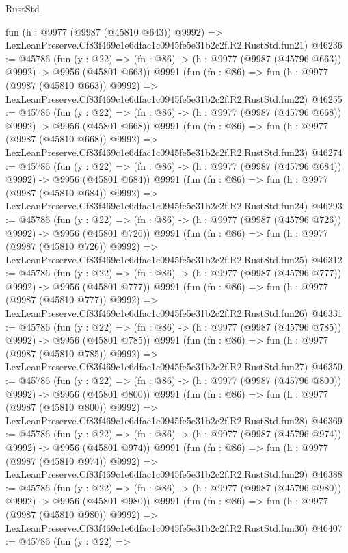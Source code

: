 \begin{lexlean}{RustStd}
\begin{coremodule}
    fun (h : @9977 (@9987 (@45810 @643)) @9992) =>
    LexLeanPreserve.Cf83f469c1e6dfac1c0945fe5e31b2c2f.R2.RustStd.fun21)
@46236 := @45786
    (fun (y : @22) => (fn : @86) -> (h : @9977 (@9987 (@45796 @663)) @9992) -> @9956 (@45801 @663))
    @9991
    (fun (fn : @86) =>
    fun (h : @9977 (@9987 (@45810 @663)) @9992) =>
    LexLeanPreserve.Cf83f469c1e6dfac1c0945fe5e31b2c2f.R2.RustStd.fun22)
@46255 := @45786
    (fun (y : @22) => (fn : @86) -> (h : @9977 (@9987 (@45796 @668)) @9992) -> @9956 (@45801 @668))
    @9991
    (fun (fn : @86) =>
    fun (h : @9977 (@9987 (@45810 @668)) @9992) =>
    LexLeanPreserve.Cf83f469c1e6dfac1c0945fe5e31b2c2f.R2.RustStd.fun23)
@46274 := @45786
    (fun (y : @22) => (fn : @86) -> (h : @9977 (@9987 (@45796 @684)) @9992) -> @9956 (@45801 @684))
    @9991
    (fun (fn : @86) =>
    fun (h : @9977 (@9987 (@45810 @684)) @9992) =>
    LexLeanPreserve.Cf83f469c1e6dfac1c0945fe5e31b2c2f.R2.RustStd.fun24)
@46293 := @45786
    (fun (y : @22) => (fn : @86) -> (h : @9977 (@9987 (@45796 @726)) @9992) -> @9956 (@45801 @726))
    @9991
    (fun (fn : @86) =>
    fun (h : @9977 (@9987 (@45810 @726)) @9992) =>
    LexLeanPreserve.Cf83f469c1e6dfac1c0945fe5e31b2c2f.R2.RustStd.fun25)
@46312 := @45786
    (fun (y : @22) => (fn : @86) -> (h : @9977 (@9987 (@45796 @777)) @9992) -> @9956 (@45801 @777))
    @9991
    (fun (fn : @86) =>
    fun (h : @9977 (@9987 (@45810 @777)) @9992) =>
    LexLeanPreserve.Cf83f469c1e6dfac1c0945fe5e31b2c2f.R2.RustStd.fun26)
@46331 := @45786
    (fun (y : @22) => (fn : @86) -> (h : @9977 (@9987 (@45796 @785)) @9992) -> @9956 (@45801 @785))
    @9991
    (fun (fn : @86) =>
    fun (h : @9977 (@9987 (@45810 @785)) @9992) =>
    LexLeanPreserve.Cf83f469c1e6dfac1c0945fe5e31b2c2f.R2.RustStd.fun27)
@46350 := @45786
    (fun (y : @22) => (fn : @86) -> (h : @9977 (@9987 (@45796 @800)) @9992) -> @9956 (@45801 @800))
    @9991
    (fun (fn : @86) =>
    fun (h : @9977 (@9987 (@45810 @800)) @9992) =>
    LexLeanPreserve.Cf83f469c1e6dfac1c0945fe5e31b2c2f.R2.RustStd.fun28)
@46369 := @45786
    (fun (y : @22) => (fn : @86) -> (h : @9977 (@9987 (@45796 @974)) @9992) -> @9956 (@45801 @974))
    @9991
    (fun (fn : @86) =>
    fun (h : @9977 (@9987 (@45810 @974)) @9992) =>
    LexLeanPreserve.Cf83f469c1e6dfac1c0945fe5e31b2c2f.R2.RustStd.fun29)
@46388 := @45786
    (fun (y : @22) => (fn : @86) -> (h : @9977 (@9987 (@45796 @980)) @9992) -> @9956 (@45801 @980))
    @9991
    (fun (fn : @86) =>
    fun (h : @9977 (@9987 (@45810 @980)) @9992) =>
    LexLeanPreserve.Cf83f469c1e6dfac1c0945fe5e31b2c2f.R2.RustStd.fun30)
@46407 := @45786
    (fun (y : @22) =>

\end{coremodule}
\end{lexlean}

